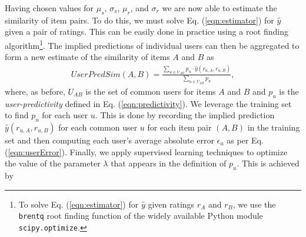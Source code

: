 \documentclass[11pt]{article}
\begin{document}
Having chosen values for $\mu_s$, $\sigma_s$, $\mu_r$, and $\sigma_r$ we are now
able to estimate the similarity of item pairs. To do this, we must solve Eq.
(\ref{eqn:estimator}) for $\hat{y}$ given a pair of ratings. This can be easily
done in practice using a root finding algorithm\footnote{To solve Eq.
(\ref{eqn:estimator}) for $\hat{y}$ given ratings $r_A$ and $r_B$, we use the
{\tt brentq} root finding function of the widely available Python module {\tt
scipy.optimize}.}. The implied predictions of individual users can then be
aggregated to form a new estimate of the similarity of items $A$ and $B$ as
\begin{align}\label{eqn:userPredSim}
UserPredSim(A,B) = \frac{\sum_{u \in U_{AB}}{p_u\cdot\hat{y}(r_{u,A}, r_{u,B})}}
{\sum_{u \in U_{AB}}{p_u}},
\end{align}
where, as before, $U_{AB}$ is the set of common users for items $A$ and $B$ and
$p_u$ is the {\em user-predictivity} defined in Eq. (\ref{eqn:predictivity}). We
leverage the training set to find $p_u$ for each user $u$. This is done by
recording the implied prediction $\hat{y}(r_{u,A},r_{u,B})$ for each common user
$u$ for each item pair $(A, B)$ in the training set and then computing each
user's average absolute error $\epsilon_u$ as per Eq. (\ref{eqn:userError}).
Finally, we apply supervised learning techniques to optimize the value of the
parameter $\lambda$ that appears in the definition of $p_u$. This is achieved by
\end{document}
